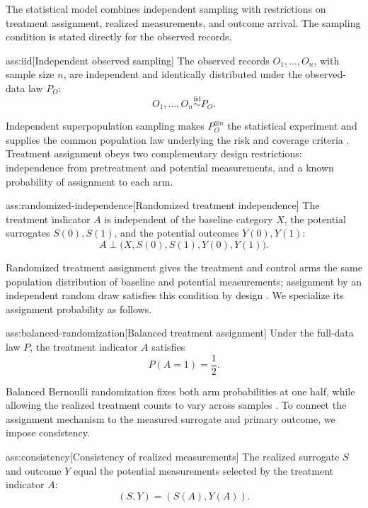 \documentclass[11pt]{article}
\begin{document}
The statistical model combines independent sampling with restrictions on treatment assignment, realized measurements, and outcome arrival. The sampling condition is stated directly for the observed records.

\begin{assumptionv}{ass:iid}[Independent observed sampling]
The observed records \(O_1,\ldots,O_n\), with sample size \(n\), are independent and identically distributed under the observed-data law \(P_O\):
\[
O_1,\ldots,O_n\stackrel{\mathrm{iid}}{\sim}P_O.
\]
\end{assumptionv}

Independent superpopulation sampling makes \(P_O^{\otimes n}\) the statistical experiment and supplies the common population law underlying the risk and coverage criteria \citep{vanDerVaart1998}. Treatment assignment obeys two complementary design restrictions: independence from pretreatment and potential measurements, and a known probability of assignment to each arm.

\begin{assumptionv}{ass:randomized-independence}[Randomized treatment independence]
The treatment indicator \(A\) is independent of the baseline category \(X\), the potential surrogates \(S(0),S(1)\), and the potential outcomes \(Y(0),Y(1)\):
\[
A\perp \bigl(X,S(0),S(1),Y(0),Y(1)\bigr).
\]
\end{assumptionv}

Randomized treatment assignment gives the treatment and control arms the same population distribution of baseline and potential measurements; assignment by an independent random draw satisfies this condition by design \citep{ImbensRubin2015}. We specialize its assignment probability as follows.

\begin{assumptionv}{ass:balanced-randomization}[Balanced treatment assignment]
Under the full-data law \(P\), the treatment indicator \(A\) satisfies
\[
P(A=1)=\frac12.
\]
\end{assumptionv}

Balanced Bernoulli randomization fixes both arm probabilities at one half, while allowing the realized treatment counts to vary across samples \citep{ImbensRubin2015}. To connect the assignment mechanism to the measured surrogate and primary outcome, we impose consistency.

\begin{assumptionv}{ass:consistency}[Consistency of realized measurements]
The realized surrogate \(S\) and outcome \(Y\) equal the potential measurements selected by the treatment indicator \(A\):
\[
(S,Y)=(S(A),Y(A)).
\]
\end{assumptionv}
\end{document}
